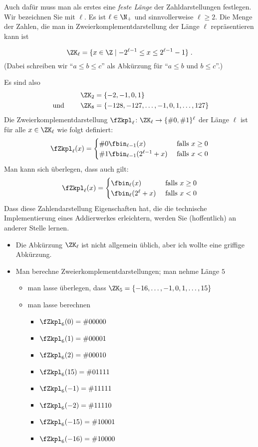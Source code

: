 Auch dafür muss man als erstes eine \emph{feste Länge} der
Zahldarstellungen festlegen. 
%
Wir bezeichnen Sie mit $\ell$.
%
Es ist $\ell\in\N_+$ und sinnvollerweise $\ell\geq 2$.
%
Die Menge der Zahlen, die man in Zweierkomplementdarstellung der Länge
$\ell$ repräsentieren kann ist
%
\begin{samepage}
\[
\ZK_{\ell} = \{ x\in \Z \mid -2^{\ell-1} \leq x \leq 2^{\ell-1} -1 \} \;.
\]
%
(Dabei schreiben wir "`$a\leq b\leq c$"'
als Abkürzung für "`$a\leq b$ und $b\leq c$"'.)
\end{samepage}
% 
Es sind also \zB
\begin{align*}
  \ZK_2 &= \{ -2, -1, 0, 1\} \\
   \text{  und   \qquad }  \ZK_8 &= \{ -128, -127, \dots, -1, 0, 1, \dots, 127 \}
\end{align*}
%
Die Zweierkomplementdarstellung
$\fZkpl_{\ell}\colon \ZK_{\ell} \to \{\#0,\#1\}^{\ell}$ der Länge
$\ell$ ist für alle $x\in\ZK_{\ell}$ wie folgt definiert:
\[
\fZkpl_{\ell}(x) =
\begin{cases}
  \#0 \fbin_{\ell-1}(x) & \text{ falls } x\geq 0 \\
  \#1 \fbin_{\ell-1}(2^{\ell-1} + x) & \text{ falls } x< 0 
\end{cases}
\]
%
Man kann sich überlegen, dass auch gilt:
\[
\fZkpl_{\ell}(x) =
\begin{cases}
  \fbin_{\ell}(x) & \text{ falls } x\geq 0 \\
  \fbin_{\ell}(2^{\ell} + x) & \text{ falls } x< 0 
\end{cases}
\]
%
Dass diese Zahlendarstellung Eigenschaften hat, die \zB die technische
Implementierung eines Addierwerkes erleichtern, werden Sie
(hoffentlich) an anderer Stelle lernen.
%
\begin{tutorium}
  \begin{itemize} 
  \item Die Abkürzung $\ZK_{\ell}$ ist nicht allgemein üblich, aber
    ich wollte eine griffige Abkürzung.
  \item Man berechne Zweierkomplementdarstellungen; man nehme Länge $5$
    \begin{itemize}
    \item man lasse überlegen, dass
      $\ZK_5=\{-16, \dots, -1,0,1,\dots,15\}$
    \item man lasse \zB berechnen 
      \begin{itemize}
      \item $\fZkpl_6(0) = \#{00000}$
      \item $\fZkpl_6(1) = \#{00001}$
      \item $\fZkpl_6(2) = \#{00010}$
      \item $\fZkpl_6(15) = \#{01111}$
      \item $\fZkpl_6(-1) = \#{11111}$
      \item $\fZkpl_6(-2) = \#{11110}$
      \item $\fZkpl_6(-15) = \#{10001}$
      \item $\fZkpl_6(-16) = \#{10000}$
      \end{itemize}
    \end{itemize}
  \end{itemize}
\end{tutorium}
